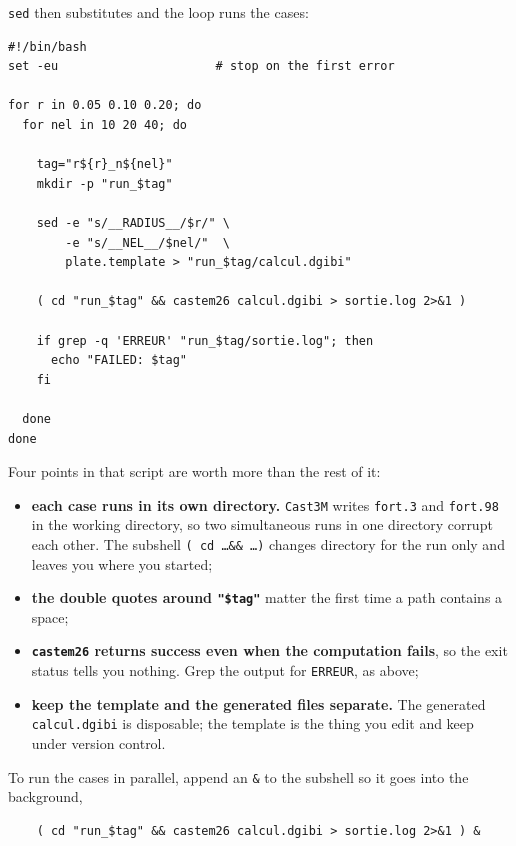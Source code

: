 \noindent \texttt{sed} then substitutes and the loop runs the cases:

\begin{codebox}
\begin{verbatim}
#!/bin/bash
set -eu                      # stop on the first error

for r in 0.05 0.10 0.20; do
  for nel in 10 20 40; do

    tag="r${r}_n${nel}"
    mkdir -p "run_$tag"

    sed -e "s/__RADIUS__/$r/" \
        -e "s/__NEL__/$nel/"  \
        plate.template > "run_$tag/calcul.dgibi"

    ( cd "run_$tag" && castem26 calcul.dgibi > sortie.log 2>&1 )

    if grep -q 'ERREUR' "run_$tag/sortie.log"; then
      echo "FAILED: $tag"
    fi

  done
done
\end{verbatim}
\end{codebox}

\noindent Four points in that script are worth more than the rest of it:

\begin{itemize}
\item \textbf{each case runs in its own directory.} \texttt{Cast3M} writes
  \texttt{fort.3} and \texttt{fort.98} in the working directory, so two
  simultaneous runs in one directory corrupt each other. The subshell
  \texttt{( cd \ldots \&\& \ldots )} changes directory for the run only and
  leaves you where you started;
\item \textbf{the double quotes around \texttt{"\$tag"}} matter the first time
  a path contains a space;
\item \textbf{\texttt{castem26} returns success even when the computation
  fails}, so the exit status tells you nothing. Grep the output for
  \texttt{ERREUR}, as above;
\item \textbf{keep the template and the generated files separate.} The
  generated \texttt{calcul.dgibi} is disposable; the template is the thing you
  edit and keep under version control.
\end{itemize}

\noindent To run the cases in parallel, append an \verb|&| to the subshell so
it goes into the background,

\begin{codebox}
\begin{verbatim}
    ( cd "run_$tag" && castem26 calcul.dgibi > sortie.log 2>&1 ) &
\end{verbatim}
\end{codebox}

